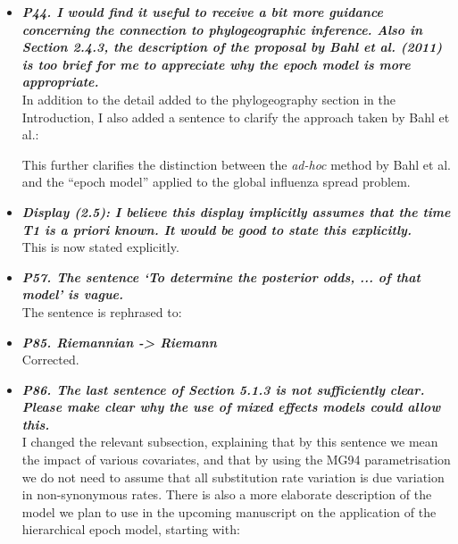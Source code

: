 \documentclass[english]{article}
\begin{document}
\begin{itemize}
\item {
{\it
\textbf{
P44. I would find it useful to receive a bit more guidance concerning the connection to phylogeographic inference. 
Also in Section 2.4.3, the description of the proposal by Bahl et al. (2011) is too brief for me to appreciate why the epoch model is more appropriate.
}%
}%
}%
\\
In addition to the detail added to the phylogeography section in the Introduction, I also added a sentence to clarify the approach taken by Bahl et al.:

\begin{quote}
\myeditsvsixteen
\end{quote}

This further clarifies the distinction between the \emph{ad-hoc} method by Bahl et al. and the ``epoch model'' applied to the global influenza spread problem.

\item {
{\it
\textbf{
Display (2.5): I believe this display implicitly assumes that the time T1 is a priori known. 
It would be good to state this explicitly.
}%
}%
}%
\\
This is now stated explicitly.


\item {
{\it
\textbf{
P57. The sentence `To determine the posterior odds, ... of that model' is vague.
}%
}%
}%
\\
The sentence is rephrased to:

\begin{quote}
\myeditsveighteen
\end{quote}


\item {
{\it
\textbf{
P85. Riemannian -> Riemann
}%
}%
}%
\\
Corrected.


\item {
{\it
\textbf{
P86. The last sentence of Section 5.1.3 is not sufficiently clear. 
Please make clear why the use of mixed effects models could allow this.
}%
}%
}%
\\
I changed the relevant subsection, %
explaining that by this sentence we mean the impact of various covariates,  and that by using the MG94 parametrisation we do not need to assume that all substitution rate variation is due variation in non-synonymous rates.
There is also a more elaborate description of the model we plan to use in the upcoming manuscript on the application of the hierarchical epoch model, starting with:


\end{itemize}
\end{document}
